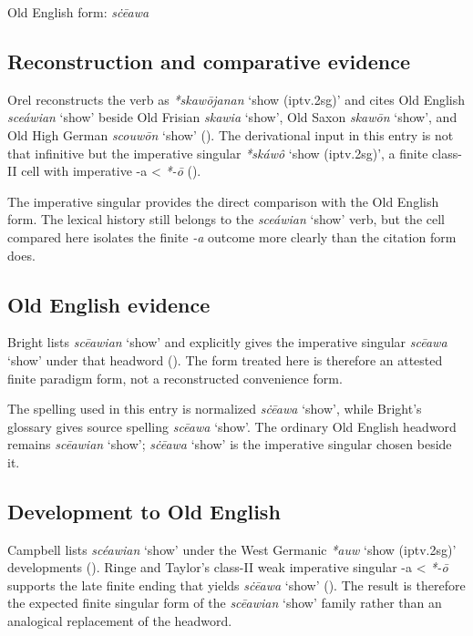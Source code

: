 \documentclass[
  british,
  a4paper,
  openany]{book}
\providecommand{\Recon}[1]{\emph{*#1}}
{\catcode`→=\active \global\def→{\ensuremath{\rightarrow}}}
\providecommand{\Recon}[1]{\emph{*#1}}
{\catcode`→=\active \global\def→{\ensuremath{\rightarrow}}}
\begin{document}
Old English form: \emph{sċēawa}

\subsection{Reconstruction and comparative
evidence}\label{reconstruction-and-comparative-evidence-134}

Orel reconstructs the verb as \Recon{skawōjanan} `show (iptv.2sg)' and
cites Old English \emph{sceáwian} `show' beside Old Frisian
\emph{skawia} `show', Old Saxon \emph{skawōn} `show', and Old High
German \emph{scouwōn} `show' ().
The derivational input in this entry is not that infinitive but the
imperative singular \Recon{skáwô} `show (iptv.2sg)', a finite class-II
cell with imperative -a \textless{} \emph{*-ō}
().

The imperative singular provides the direct comparison with the Old
English form. The lexical history still belongs to the \emph{sceáwian}
`show' verb, but the cell compared here isolates the finite \emph{-a}
outcome more clearly than the citation form does.

\subsection{Old English evidence}\label{old-english-evidence-134}

Bright lists \emph{scēawian} `show' and explicitly gives the imperative
singular \emph{scēawa} `show' under that headword
(). The form
treated here is therefore an attested finite paradigm form, not a
reconstructed convenience form.

The spelling used in this entry is normalized \emph{sċēawa} `show',
while Bright's glossary gives source spelling \emph{scēawa} `show'. The
ordinary Old English headword remains \emph{scēawian} `show';
\emph{sċēawa} `show' is the imperative singular chosen beside it.

\subsection{Development to Old
English}\label{development-to-old-english-134}

Campbell lists \emph{scéawian} `show' under the West Germanic
\Recon{auw} `show (iptv.2sg)' developments
(). Ringe and
Taylor's class-II weak imperative singular -a \textless{} \emph{*-ō}
supports the late finite ending that yields \emph{sċēawa} `show'
(). The result
is therefore the expected finite singular form of the \emph{scēawian}
`show' family rather than an analogical replacement of the headword.
\end{document}
